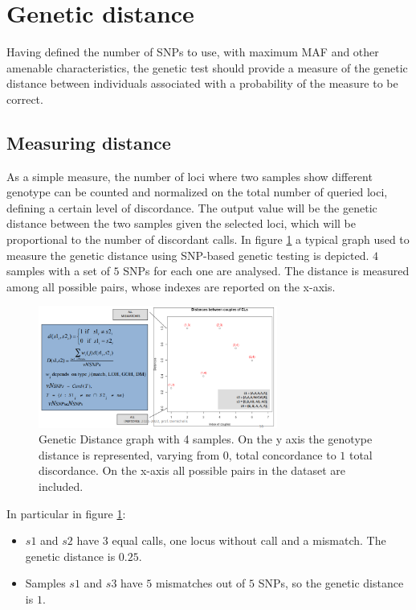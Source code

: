 \section{Genetic distance}
Having defined the number of SNPs to use, with maximum MAF and other amenable characteristics, the genetic test should provide a measure of the genetic distance between individuals associated with a probability of the measure to be correct.

	\subsection{Measuring distance}
	As a simple measure, the number of loci where two samples show different genotype can be counted and normalized on the total number of queried loci, defining a certain level of discordance.
	The output value will be the genetic distance between the two samples given the selected loci, which will be proportional to the number of discordant calls.
	In figure \ref{fig:Distance} a typical graph used to measure the genetic distance using SNP-based genetic testing is depicted.
	$4$ samples with a set of $5$ SNPs for each one are analysed.
	The distance is measured among all possible pairs, whose indexes are reported on the x-axis.

	\begin{figure}[H]
		\centering
		\includegraphics[width=0.7\textwidth]{loci.PNG}
		\caption{Genetic Distance graph with 4 samples. On the y axis the genotype distance is represented, varying from $0$, total concordance to $1$ total discordance. On the x-axis all possible pairs in the dataset are included.}
		\label{fig:Distance}
	\end{figure}

	In particular in figure \ref{fig:Distance}:

	\begin{multicols}{2}
		\begin{itemize}
			\item $s1$ and $s2$ have $3$ equal calls, one locus without call and a mismatch.
				The genetic distance is $0.25$.
			\item Samples $s1$ and $s3$ have $5$ mismatches out of $5$ SNPs, so the genetic distance is $1$.
		\end{itemize}
	\end{multicols}

